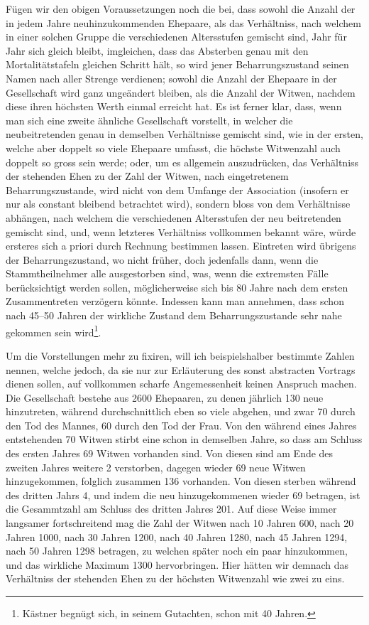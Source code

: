 \documentclass[12pt,a4paper]{article}
\begin{document}
F\"ugen wir den obigen Voraussetzungen noch die bei, dass sowohl die Anzahl der in jedem Jahre neuhinzukommenden Ehepaare, als das Verh\"altniss, nach welchem in einer solchen Gruppe die verschiedenen Altersstufen gemischt sind, Jahr f\"ur Jahr sich gleich bleibt, imgleichen, dass das Absterben genau mit den Mortalit\"atstafeln gleichen Schritt h\"alt, so wird jener Beharrungszustand seinen Namen nach aller Strenge verdienen; sowohl die Anzahl der Ehepaare in der Gesellschaft wird ganz unge\"andert bleiben, als die Anzahl der Witwen, nachdem diese ihren h\"ochsten Werth einmal erreicht hat. Es ist ferner klar, dass, wenn man sich eine zweite \"ahnliche Gesellschaft vorstellt, in welcher die neubeitretenden genau in demselben Verh\"altnisse gemischt sind, wie in der ersten, welche aber doppelt so viele Ehepaare umfasst, die h\"ochste Witwenzahl auch doppelt so gross sein werde; oder, um es allgemein auszudr\"ucken, das Verh\"altniss der stehenden Ehen zu der Zahl der Witwen, nach eingetretenem Beharrungszustande, wird nicht von dem Umfange der Association (insofern er nur als constant bleibend betrachtet wird), sondern bloss von dem Verh\"altnisse abh\"angen, nach welchem die verschiedenen Altersstufen der neu beitretenden gemischt sind, und, wenn letzteres Verh\"altniss vollkommen bekannt w\"are, w\"urde ersteres sich a priori durch Rechnung bestimmen lassen. Eintreten wird \"ubrigens der Beharrungszustand, wo nicht fr\"uher, doch jedenfalls dann, wenn die Stammtheilnehmer alle ausgestorben sind, was, wenn die extremsten F\"alle ber\"ucksichtigt werden sollen, m\"oglicherweise sich bis 80 Jahre nach dem ersten Zusammentreten verz\"ogern k\"onnte. Indessen kann man annehmen, dass schon nach 45--50 Jahren der wirkliche Zustand dem Beharrungszustande sehr nahe gekommen sein wird\footnote{K\"astner begn\"ugt sich, in seinem Gutachten, schon mit 40 Jahren.}.

Um die Vorstellungen mehr zu fixiren, will ich beispielshalber bestimmte Zahlen nennen, welche jedoch, da sie nur zur Erl\"auterung des sonst abstracten Vortrags dienen sollen, auf vollkommen scharfe Angemessenheit keinen Anspruch machen. Die Gesellschaft bestehe aus 2600 Ehepaaren, zu denen j\"ahrlich 130 neue hinzutreten, w\"ahrend durchschnittlich eben so viele abgehen, und zwar 70 durch den Tod des Mannes, 60 durch den Tod der Frau. Von den w\"ahrend eines Jahres entstehenden 70 Witwen stirbt eine schon in demselben Jahre, so dass am Schluss des ersten Jahres 69 Witwen vorhanden sind. Von diesen sind am Ende des zweiten Jahres weitere 2 verstorben, dagegen wieder 69 neue Witwen hinzugekommen, folglich zusammen 136 vorhanden. Von diesen sterben w\"ahrend des dritten Jahrs 4, und indem die neu hinzugekommenen wieder 69 betragen, ist die Gesammtzahl am Schluss des dritten Jahres 201. Auf diese Weise immer langsamer fortschreitend mag die Zahl der Witwen nach 10 Jahren 600, nach 20 Jahren 1000, nach 30 Jahren 1200, nach 40 Jahren 1280, nach 45 Jahren 1294, nach 50 Jahren 1298 betragen, zu welchen sp\"ater noch ein paar hinzukommen, und das wirkliche Maximum 1300 hervorbringen. Hier h\"atten wir demnach das Verh\"altniss der stehenden Ehen zu der h\"ochsten Witwenzahl wie zwei zu eins.
\end{document}

